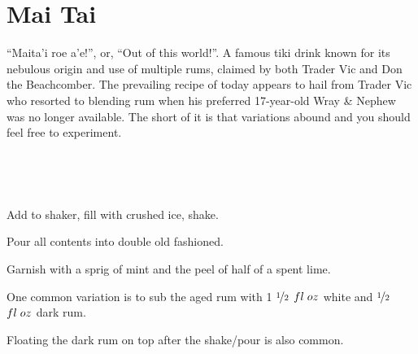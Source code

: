 \section[Mai Tai]{Mai Tai}

\begin{recipestats}[
	servings=1,
	preptime=5 \minute,
	original=\citefield{cocktailSeminars2021}{title}~\cite{cocktailSeminars2021},
]
\end{recipestats}


\begin{recipeabstract}
	``Maita'i roe a'e!'', or, ``Out of this world!''.
	A famous tiki drink known for its nebulous origin and use of multiple rums, claimed by both Trader Vic and Don the Beachcomber.
	The prevailing recipe of today appears to hail from Trader Vic who resorted to blending rum when his preferred 17-year-old Wray \& Nephew was no longer available.
	The short of it is that variations abound and you should feel free to experiment.

\end{recipeabstract}


\begin{ingredientcolumns}
	\begin{ingredientblock}
		\\
	\end{ingredientblock}
	\begin{ingredientblock}
		\ingredient[\onehalf][\fluidounce]{cura\c{c}ao}\\
		\ingredient[\onehalf][\fluidounce]{orgeat}
	\end{ingredientblock}
\end{ingredientcolumns}


\begin{preparation}
\item Add to shaker, fill with crushed ice, shake.
\item Pour all contents into double old fashioned.
\item Garnish with a sprig of mint and the peel of half of a spent lime.
\end{preparation}


\begin{variation}
\item One common variation is to sub the aged rum with 1 $\nicefrac{1}{2}$ $fl\;oz$ white and $\nicefrac{1}{2}$ $fl\;oz$ dark rum.
\item Floating the dark rum on top after the shake/pour is also common.
\end{variation}


\recipeend
